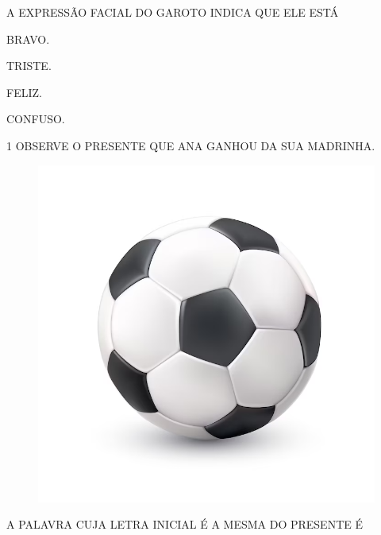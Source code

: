 A EXPRESSÃO FACIAL DO GAROTO INDICA QUE ELE ESTÁ

\begin{escolha}

\item BRAVO.

\item TRISTE.

\item FELIZ.

\item CONFUSO.

\end{escolha}

\blankpage
\vspace*{-3.4cm}


\num{1} OBSERVE O PRESENTE QUE ANA GANHOU DA SUA MADRINHA.

\begin{figure}[H]
\centering
\includegraphics[width=\textwidth]{./media/image221.png}
\end{figure}

A PALAVRA CUJA LETRA INICIAL É A MESMA DO PRESENTE É

